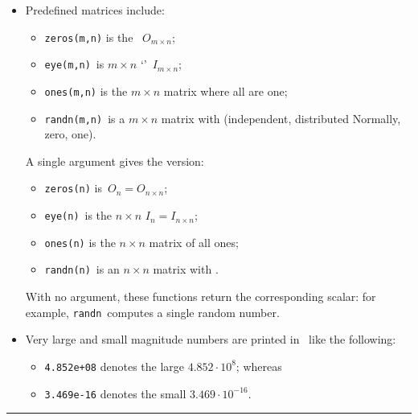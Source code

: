 \begin{table}
\begin{minipage}{\linewidth}
\begin{itemize}
\item Predefined matrices include:
\begin{itemize}
\item {}\verb|zeros(m,n)| is the ~\(O_{m\times n}\);
\item {}\verb|eye(m,n)|~is \(m\times n\) `'~\(I_{m\times n}\);
\item {}\verb|ones(m,n)| is the \(m\times n\) matrix where all  are one;
\item {}\verb|randn(m,n)|~is a \(m\times n\) matrix with  (independent, distributed Normally,  zero,  one).
\end{itemize}
A single argument gives the  version: 
\begin{itemize}
\item {}\verb|zeros(n)| is~\(O_n=O_{n\times n}\); 
\item \verb|eye(n)|~is the \(n\times n\)  \(I_n=I_{n\times n}\);  
\item \verb|ones(n)| is the \(n\times n\) matrix of all ones;
\item {}\verb|randn(n)|~is an \(n\times n\) matrix with .
\end{itemize}
With no argument, these functions return the corresponding scalar: for example, \verb|randn|~computes a single random number.
\item Very large and small magnitude numbers are printed in \script\ like the following: 
\begin{itemize}
\item \verb|4.852e+08| denotes the large \(4.852\cdot10^8\); whereas 
\item \verb|3.469e-16| denotes the small \(3.469\cdot10^{-16}\).
\end{itemize}
\end{itemize}
\end{minipage}
\hrule
\end{table}

